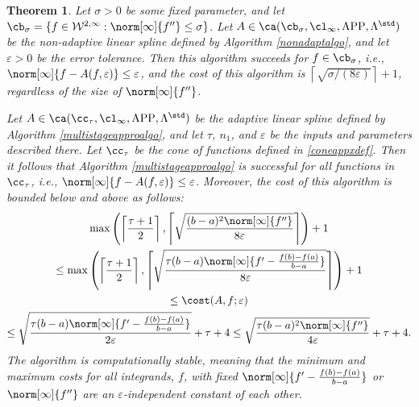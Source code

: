 \documentclass[]{elsarticle}
\DeclareMathOperator{\APP}{APP}
\newtheorem{theorem}{Theorem}
\theoremstyle{definition}
\theoremstyle{remark}
\begin{document}
\begin{theorem} \label{multistageappxthm}
Let $\sigma >0$ be some fixed parameter, and let $\cb_{\sigma}=\{f \in  \mathcal{W}^{2,\infty} : \norm[\infty]{f''}\leq \sigma\}$. Let $A \in \ca(\cb_{\sigma}, \cl_{\infty}, \APP, \Lambda^{\std})$ be the non-adaptive linear spline defined by Algorithm \ref{nonadaptalgo}, and let $\varepsilon>0$ be the error tolerance. Then this algorithm succeeds for $f \in \cb_{\sigma}$, i.e., $\norm[\infty]{f - A(f,\varepsilon)} \le \varepsilon$, and the cost of this algorithm is $\left \lceil \sqrt{\sigma/(8\varepsilon)}\right \rceil + 1$, regardless of the size of $\norm[\infty]{f''}$.

Let $A \in \ca(\cc_{\tau}, \cl_{\infty}, \APP, \Lambda^{\std})$ be the adaptive linear spline defined by Algorithm \ref{multistageapproalgo}, and let $\tau$, $n_1$, and $\varepsilon$ be the inputs and parameters described there. Let $\cc_\tau$ be the cone of functions defined in \eqref{coneappxdef}.  Then it follows that Algorithm \ref{multistageapproalgo} is successful for all functions in $\cc_{\tau}$,  i.e.,  $\norm[\infty]{f - A(f,\varepsilon)} \le \varepsilon$.  Moreover, the cost of this algorithm is bounded below and above as follows:
\begin{multline}
\max \left(\left \lceil\frac{\tau+1}{2} \right \rceil, \left \lceil \sqrt{\frac{(b-a)^2 \norm[\infty]{f''}}{8\varepsilon}} \right \rceil \right) +1 \\
\le \max \left(\left \lceil\frac{\tau+1}{2} \right \rceil, \left \lceil \sqrt{\frac{\tau (b-a) \norm[\infty]{f'-
\frac{f(b)-f(a)}{b-a}}}{8\varepsilon}} \right \rceil \right) +1 \\
\le
\cost(A,f;\varepsilon) \\
\le \sqrt{\frac{\tau (b-a)  \norm[\infty]{f'-\frac{f(b)-f(a)}{b-a}}}{2\varepsilon}} + \tau + 4
\le \sqrt{\frac{\tau (b-a)^2\norm[\infty]{f''} }{4\varepsilon}} + \tau + 4.
\end{multline}
The algorithm is computationally stable, meaning that the minimum and maximum costs for all integrands, $f$, with fixed $\norm[\infty]{f'-\frac{f(b)-f(a)}{b-a}}$ or $\norm[\infty]{f''}$ are an $\varepsilon$-independent constant of each other.
\end{theorem}
\end{document}
